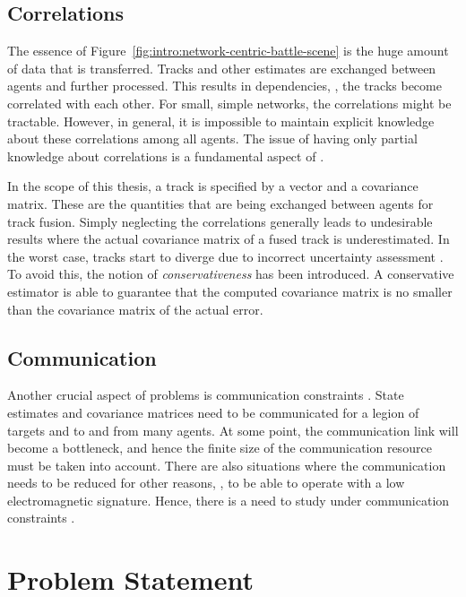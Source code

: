 \subsection{Correlations}

The essence of Figure~\ref{fig:intro:network-centric-battle-scene} is the huge amount of data that is transferred. Tracks and other estimates are exchanged between agents and further processed. This results in dependencies, \ie, the tracks become correlated with each other. For small, simple networks, the correlations might be tractable. However, in general, it is impossible to maintain explicit knowledge about these correlations among all agents. The issue of having only partial knowledge about correlations is a fundamental aspect of \abbrDTT.

In the scope of this thesis, a track is specified by a vector and a covariance matrix. These are the quantities that are being exchanged between agents for track fusion. Simply neglecting the correlations generally leads to undesirable results where the actual covariance matrix of a fused track is underestimated. In the worst case, tracks start to diverge due to incorrect uncertainty assessment \cite{Julier2009-ch14}. To avoid this, the notion of \emph{conservativeness} has been introduced. A conservative estimator is able to guarantee that the computed covariance matrix is no smaller than the covariance matrix of the actual error. 




\subsection{Communication}

Another crucial aspect of \abbrDTT problems is communication constraints \cite{Razzaque2013ACM}. State estimates and covariance matrices need to be communicated for a legion of targets and to and from many agents. At some point, the communication link will become a bottleneck, and hence the finite size of the communication resource must be taken into account. There are also situations where the communication needs to be reduced for other reasons, \eg, to be able to operate with a low electromagnetic signature. Hence, there is a need to study \abbrDTT under communication constraints \cite{Kimura2005ITCC}.





\section{Problem Statement} \label{sec:intro:problem-statement}

